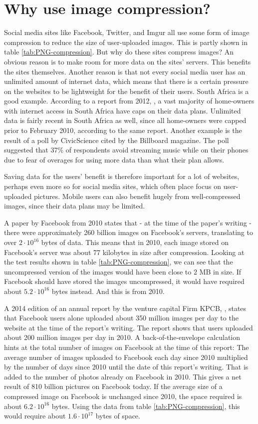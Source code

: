 \section{Why use image compression?}
Social media sites like Facebook, Twitter, and Imgur all use some form of image compression to reduce the size of user-uploaded images.
This is partly shown in table \ref{tab:PNG-compression}.
But why do these sites compress images?
An obvious reason is to make room for more data on the sites' servers.
This benefits the sites themselves.
Another reason is that not every social media user has an unlimited amount of internet data, which means that there is a certain pressure on the websites to be lightweight for the benefit of their users.
South Africa is a good example. According to a report from 2012, \citep{chetty_2012}, a vast majority of home-owners with internet access in South Africa have caps on their data plans.
Unlimited data is fairly recent in South Africa as well, since all home-owners were capped prior to February 2010, according to the same report.
Another example is the result of a poll by CivicScience\citep{tmobilemusic} cited by the Billboard magazine.
The poll suggested that 37\% of respondents avoid streaming music while on their phones due to fear of overages for using more data than what their plan allows.

Saving data for the users' benefit is therefore important for a lot of websites, perhaps even more so for social media sites, which often place focus on user-uploaded pictures. Mobile users can also benefit hugely from well-compressed images, since their data plans may be limited.

A paper by Facebook from 2010 \citep{beaver2010} states that - at the time of the paper's writing - there were approximately 260 billion images on Facebook's servers, translating to over $2\cdot10^{16}$ bytes of data.
This means that in 2010, each image stored on Facebook's server was about 77 kilobytes in size after compression.
Looking at the test results shown in table \ref{tab:PNG-compression}, we can see that the uncompressed version of the images would have been close to 2 MB in size.
If Facebook should have stored the images uncompressed, it would have required about $5.2\cdot10^{16}$ bytes instead.
And this is from 2010.

A 2014 edition of an annual report by the venture capital Firm KPCB, \citep{meeker2014internet}, states that Facebook users alone uploaded about
350 million images per day to the website at the time of the report's writing.
The report shows that users uploaded about 200 million images per day in 2010.
A back-of-the-envelope calculation hints at the total number of images on Facebook at the time of this report:
The average number of images uploaded to Facebook each day since 2010 multiplied by the number of days since 2010 until the date of this report's writing.
That is added to the number of photos already on Facebook in 2010.
This gives a net result of 810 billion pictures on Facebook today.
If the average size of a compressed image on Facebook is unchanged since 2010, the space required is about $6.2\cdot10^{16}$ bytes.
Using the data from table \ref{tab:PNG-compression}, this would require about $1.6\cdot10^{17}$ bytes of space.

